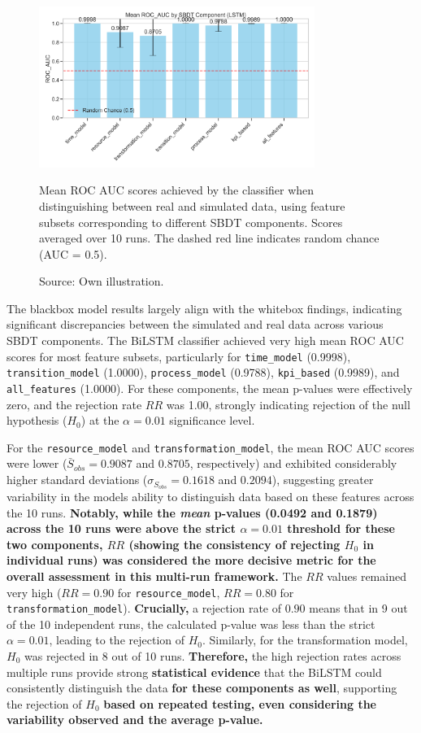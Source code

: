 \begin{figure}[htbp]
  \centering
  \includegraphics[width=0.8\textwidth]{figures/lstm-roc-auc-by-component.png}
  \caption[Results Blackbox model]{Mean ROC AUC scores achieved by the classifier when distinguishing between real and simulated data, using feature subsets corresponding to different SBDT components. Scores averaged over 10 runs. The dashed red line indicates random chance (AUC = 0.5).}
  \label{fig:bilstm-roc-auc}
  \caption*{Source: Own illustration.}
\end{figure}

The blackbox model results largely align with the whitebox findings, indicating significant discrepancies between the simulated and real data across various SBDT components. The BiLSTM classifier achieved very high mean ROC AUC scores for most feature subsets, particularly for \texttt{time\_model} (0.9998), \texttt{transition\_model} (1.0000), \texttt{process\_model} (0.9788), \texttt{kpi\_based} (0.9989), and \texttt{all\_features} (1.0000). For these components, the mean p-values were effectively zero, and the rejection rate $RR$ was 1.00, strongly indicating rejection of the null hypothesis ($H_0$) at the $\alpha = 0.01$ significance level.

For the \texttt{resource\_model} and \texttt{transformation\_model}, the mean ROC AUC scores were lower ($\bar{S}_{obs}=0.9087$ and $0.8705$, respectively) and exhibited considerably higher standard deviations ($\sigma_{S_{obs}}=0.1618$ and $0.2094$), suggesting greater variability in the models ability to distinguish data based on these features across the 10 runs. \textbf{Notably, while the \textit{mean} p-values (0.0492 and 0.1879) across the 10 runs were above the strict $\alpha=0.01$ threshold for these two components, $RR$ (showing the consistency of rejecting $H_0$ in individual runs) was considered the more decisive metric for the overall assessment in this multi-run framework.} The $RR$ values remained very high ($RR=0.90$ for \texttt{resource\_model}, $RR=0.80$ for \texttt{transformation\_model}). \textbf{Crucially,} a rejection rate of $0.90$ means that in 9 out of the 10 independent runs, the calculated p-value was less than the strict $\alpha=0.01$, leading to the rejection of $H_0$. Similarly, for the transformation model, $H_0$ was rejected in 8 out of 10 runs. \textbf{Therefore,} the high rejection rates across multiple runs provide strong \textbf{statistical evidence} that the BiLSTM could consistently distinguish the data \textbf{for these components as well}, supporting the rejection of $H_0$ \textbf{based on repeated testing, even considering the variability observed and the average p-value.}

